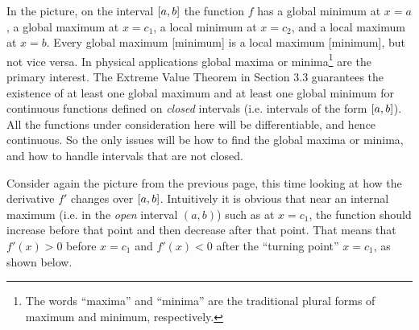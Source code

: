 \begin{center}\vspace{-14mm}
\end{center}\vspace{-2mm}
In the picture, on the
interval $\lbrack a,b \rbrack$ the function $f$ has a global minimum at $x=a$, a global
maximum at $x=c_1$, a local minimum at $x=c_2$, and a local maximum at $x=b$.
\newpage
Every global maximum [minimum] is a local maximum [minimum], but not vice versa.
In physical applications global maxima or minima\footnote{The words ``maxima''
and ``minima'' are the traditional plural forms of maximum and minimum,
respectively.} are the primary interest. The Extreme Value Theorem in Section
3.3 guarantees the existence of at least one global maximum and at least one
global minimum for continuous functions defined on \emph{closed} intervals (i.e.
intervals of the form $\lbrack a,b \rbrack$). All the functions under consideration here
will be differentiable, and hence continuous. So the only issues will be how
to find the global maxima or minima, and how to handle intervals that are not
closed.

Consider again the picture from the previous page, this time looking at how
the derivative $f'$ changes over $\lbrack a,b \rbrack$. Intuitively it is obvious that
near an internal maximum (i.e. in the \emph{open} interval $(a,b)$) such as at
$x=c_1$, the function should increase before that point and then decrease after
that point. That means that $f'(x)>0$ before $x=c_1$ and $f'(x)<0$ after the
``turning point'' $x=c_1$, as shown below.

